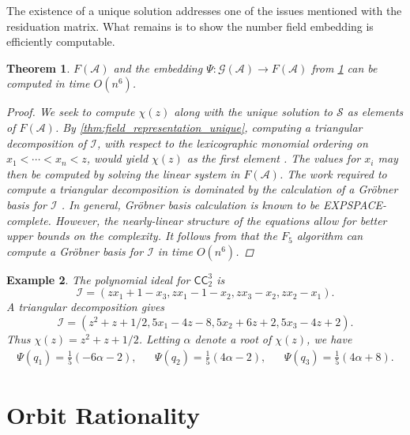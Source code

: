 \documentclass[12pt, letterpaper]{article}
\newcommand{\paren}[1]{\left(#1\right)}
\newcommand{\A}{\mathcal A}
\newcommand{\CC}{\mathsf{CC}}
\newcommand{\I}{\mathcal I}
\renewcommand{\S}{\mathcal S}
\newcommand{\gp}{\mathcal G}
\newtheorem{thm}{Theorem}[section]
\newtheorem{example}[thm]{Example}
\begin{document}
The existence of a unique solution addresses one of the issues mentioned with
the residuation matrix. What remains is to show the number field embedding is
efficiently computable.

\begin{thm}\label{thm:field_representation_efficient}
    $F(\A)$ and the embedding $\Psi : \gp(\A) \rightarrow F(\A)$ from
    \cref{thm:field_representation_efficient} can be computed in time $O(n^6)$.
    \begin{proof}
        We seek to compute $\chi(z)$ along with the unique solution to $\S$ as
        elements of $F(\A)$. By \cref{thm:field_representation_unique},
        computing a triangular decomposition of $\I$, with respect to the
        lexicographic monomial ordering on $x_1 < \cdots < x_n < z$, would
        yield $\chi(z)$ as the first element \cite{LAZARD1992117}.  The values
        for $x_i$ may then be computed by solving the linear system in $F(\A)$.
        The work required to compute a triangular decomposition is dominated by
        the calculation of a Gr\"obner basis for $\I$ \cite{LAZARD1992117}.  In
        general, Gr\"obner basis calculation is known to be EXPSPACE-complete.
        However, the nearly-linear structure of the equations allow for better
        upper bounds on the complexity. It follows from
        \cite{faugere2011grobner} that the $F_5$ algorithm can compute a
        Gr\"obner basis for $\I$ in time $O(n^6)$.
    \end{proof}
\end{thm}

\begin{example}\label{example:field-cc-3-2}
    The polynomial ideal for $\CC^3_2$ is
    \[
        \I = (zx_1 + 1 - x_3, zx_1 - 1 - x_2, zx_3 - x_2, z x_2 - x_1).
    \]
    A triangular decomposition gives
    \[
        \I = (z^2 + z + 1/2, 5x_1 - 4z - 8, 5x_2 + 6z + 2, 5x_3 - 4z + 2).
    \]
    Thus $\chi(z) = z^2 + z + 1/2$. Letting $\alpha$ denote a root of
    $\chi(z)$, we have
    \begin{align*}
        \Psi(q_1) = \frac{1}{5}\paren{-6 \alpha - 2},
        &&
        \Psi(q_2) = \frac{1}{5}\paren{4 \alpha - 2},
        &&
        \Psi(q_3) = \frac{1}{5}\paren{4 \alpha + 8}.
    \end{align*}
\end{example}

\section{Orbit Rationality}
\end{document}
